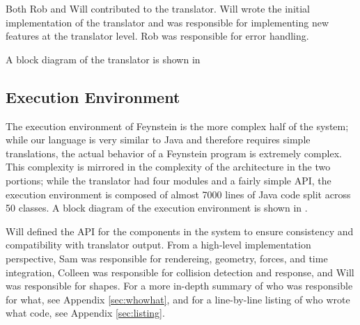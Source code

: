 Both Rob and Will contributed to the translator. Will wrote the
initial implementation of the translator and was responsible for
implementing new features at the translator level. Rob was responsible
for error handling.

A block diagram of the translator is shown in 


\subsection{Execution Environment}

The execution environment of Feynstein is the more complex half of the
system; while our language is very similar to Java and therefore
requires simple translations, the actual behavior of a Feynstein
program is extremely complex. This complexity is mirrored in the
complexity of the architecture in the two portions; while the
translator had four modules and a fairly simple API, the execution
environment is composed of almost 7000 lines of Java code split across
50 classes. A block diagram of the execution environment is shown in
.

Will defined the API for the components in the system to ensure
consistency and compatibility with translator output. From a
high-level implementation perspective, Sam was responsible for
rendereing, geometry, forces, and time integration, Colleen was responsible for collision 
detection and response, and Will was responsible for shapes. For a more
in-depth summary of who was responsible for what, see Appendix
\ref{sec:whowhat}, and for a line-by-line listing of who wrote what
code, see Appendix \ref{sec:listing}.

